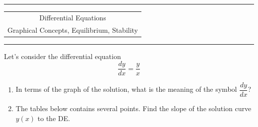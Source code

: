 \documentclass[12pt]{article}
\newcommand{\<}{\langle}
\renewcommand{\>}{\rangle}
\begin{document}
	\pagestyle{empty}

	\hrule
	\medskip
	\begin{center}
		\begin{tabular}{p{6.8in}}
			\multicolumn{1}{c}{\sc Differential Equations} \\
			\multicolumn{1}{c}{\sc Graphical Concepts, Equilibrium, Stability}
		\end{tabular}
	\end{center}
	\medskip
	\hrule

	\bigskip
	Let's consider the differential equation
	\[\frac{dy}{dx} = \frac{y}{x}\]

	\begin{enumerate}
		\item In terms of the graph of the solution, what is the meaning of the symbol $\dfrac{dy}{dx}$?
		\vspace{1cm}

		\item The tables below contains several points. Find the slope of the solution curve $y(x)$ to the DE.
		

\end{enumerate}
\end{document}
